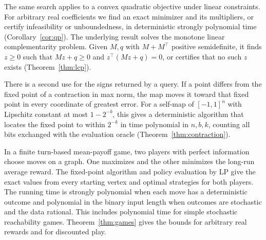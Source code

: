 The same search applies to a convex quadratic objective under linear
constraints. For arbitrary real coefficients we find an exact minimizer
and its multipliers, or certify infeasibility or unboundedness, in
deterministic strongly polynomial time (Corollary~\ref{cor:qp}).
The underlying result solves the monotone linear complementarity problem.
Given \(M,q\) with \(M+M^\top\) positive semidefinite, it finds \(z\ge0\)
such that \(Mz+q\ge0\) and \(z^\top(Mz+q)=0\), or certifies that no
such \(z\) exists (Theorem~\ref{thm:lcp}).

There is a second use for the signs returned by a query. If a point differs
from the fixed point of a contraction in max norm, the map moves it toward
that fixed point in every coordinate of greatest error. For a self-map of
\([-1,1]^n\) with Lipschitz constant at most \(1-2^{-b}\), this gives a
deterministic algorithm that locates the fixed point to within \(2^{-k}\)
in time polynomial in \(n,b,k\), counting all bits exchanged with the
evaluation oracle (Theorem~\ref{thm:contraction}).

In a finite turn-based mean-payoff game, two players with perfect information
choose moves on a graph. One maximizes and the other minimizes the long-run
average reward. The fixed-point algorithm and policy evaluation by LP give the exact values
from every starting vertex and optimal strategies for both players. The running time
is strongly polynomial when each move has a deterministic outcome and
polynomial in the binary input length when outcomes are stochastic and the
data rational. This includes polynomial time for simple stochastic reachability
games. Theorem~\ref{thm:games} gives the bounds for arbitrary real rewards
and for discounted play.


